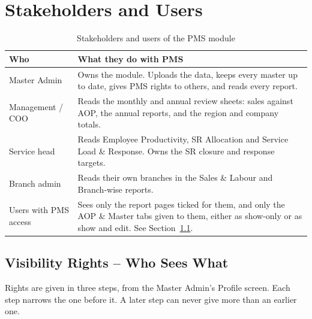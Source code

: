 \documentclass[11pt,a4paper]{article}
\begin{document}
\section{Stakeholders and Users}

\begin{table}[H]\centering\small
\renewcommand{\arraystretch}{1.25}
\begin{tabularx}{\linewidth}{@{}|p{3.6cm}|X|@{}}
\hline
\rowcolor{brdhead}\textbf{Who} & \textbf{What they do with PMS}\\
\hline
Master Admin & Owns the module. Uploads the data, keeps every master up to date, gives
PMS rights to others, and reads every report.\\
\hline
Management / COO & Reads the monthly and annual review sheets: sales against AOP, the
annual reports, and the region and company totals.\\
\hline
Service head & Reads Employee Productivity, SR Allocation and Service Load \& Response.
Owns the SR closure and response targets.\\
\hline
Branch admin & Reads their own branches in the Sales \& Labour and Branch-wise reports.\\
\hline
Users with PMS access & Sees only the report pages ticked for them, and only the AOP \&
Master tabs given to them, either as show-only or as show and edit. See
Section~\ref{sec:rights}.\\
\hline
\end{tabularx}
\caption{Stakeholders and users of the PMS module}
\end{table}

\subsection{Visibility Rights -- Who Sees What}
\label{sec:rights}

Rights are given in three steps, from the Master Admin's Profile screen. Each step
narrows the one before it. A later step can never give more than an earlier one.
\end{document}
